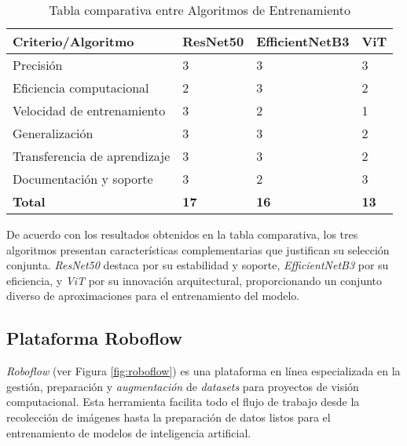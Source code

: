 \begin{table}[H]
\centering
\renewcommand{\arraystretch}{1.2}
\caption{Tabla comparativa entre Algoritmos de Entrenamiento}
\label{fig:Elec_Algoritmos}
\begin{tabular}{|p{4.5cm}|p{2.2cm}|p{2.5cm}|p{2.0cm}|}
\hline
\textbf{Criterio/Algoritmo}       & \textbf{ResNet50} & \textbf{EfficientNetB3} & \textbf{ViT} \\ \hline
Precisión                        & 3                 & 3                       & 3            \\ \hline
Eficiencia computacional         & 2                 & 3                       & 2            \\ \hline
Velocidad de entrenamiento       & 3                 & 2                       & 1            \\ \hline
Generalización                   & 3                 & 3                       & 2            \\ \hline
Transferencia de aprendizaje     & 3                 & 3                       & 2            \\ \hline
Documentación y soporte          & 3                 & 2                       & 3            \\ \hline
\textbf{Total}                   & \textbf{17}       & \textbf{16}             & \textbf{13}  \\ \hline
\end{tabular}
\end{table}

De acuerdo con los resultados obtenidos en la tabla comparativa, los tres algoritmos presentan características complementarias que justifican su selección conjunta. \textit{ResNet50} destaca por su estabilidad y soporte, \textit{EfficientNetB3} por su eficiencia, y \textit{ViT} por su innovación arquitectural, proporcionando un conjunto diverso de aproximaciones para el entrenamiento del modelo.

\subsection{Plataforma Roboflow}

\textit{Roboflow} (ver Figura \ref{fig:roboflow}) es una plataforma en línea especializada en la gestión, preparación y \textit{augmentación} de \textit{datasets} para proyectos de visión computacional. Esta herramienta facilita todo el flujo de trabajo desde la recolección de imágenes hasta la preparación de datos listos para el entrenamiento de modelos de inteligencia artificial.

